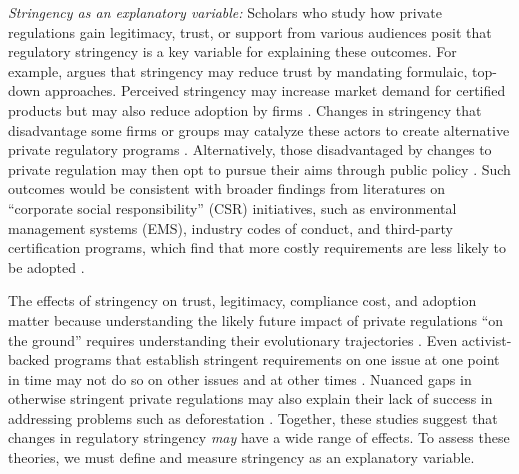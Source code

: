 \documentclass[
      12pt,
            Review ]{article}
\begin{document}
\emph{Stringency as an explanatory variable:} Scholars who study how
private regulations gain legitimacy, trust, or support from various
audiences posit that regulatory stringency is a key variable for
explaining these outcomes. For example, \citet{McDermott2012} argues
that stringency may reduce trust by mandating formulaic, top-down
approaches. Perceived stringency may increase market demand for
certified products \citep{Atkinson2014} but may also reduce adoption by
firms \citep{Prado2013}. Changes in stringency that disadvantage some
firms or groups may catalyze these actors to create alternative private
regulatory programs \citep{Meidinger2003}. Alternatively, those
disadvantaged by changes to private regulation may then opt to pursue
their aims through public policy \citep{Weimer2006}. Such outcomes would
be consistent with broader findings from literatures on ``corporate
social responsibility'' (CSR) initiatives, such as environmental
management systems (EMS), industry codes of conduct, and third-party
certification programs, which find that more costly requirements are
less likely to be adopted \citep{Delmas2008, Kollman2001, Lyon2008}.

The effects of stringency on trust, legitimacy, compliance cost, and
adoption matter because understanding the likely future impact of
private regulations ``on the ground'' requires understanding their
evolutionary trajectories \citep{VanderVen2018}. Even activist-backed
programs that establish stringent requirements on one issue at one point
in time may not do so on other issues and at other times
\citep{LeBaron2018}. Nuanced gaps in otherwise stringent private
regulations may also explain their lack of success in addressing
problems such as deforestation \citep{VanderVen2018}. Together, these
studies suggest that changes in regulatory stringency \emph{may} have a
wide range of effects. To assess these theories, we must define and
measure stringency as an explanatory variable.
\end{document}
